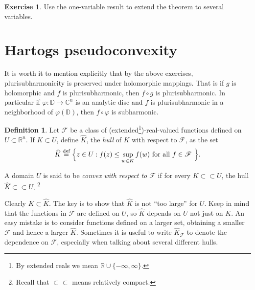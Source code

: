 \documentclass[12pt,openany]{book}
\newcommand{\C}{{\mathbb{C}}}
\newcommand{\R}{{\mathbb{R}}}
\newcommand{\D}{{\mathbb{D}}}
\newcommand{\sF}{{\mathscr{F}}}
\newcommand{\myindex}[1]{#1\index{#1}}
\theoremstyle{plain}
\theoremstyle{remark}
\theoremstyle{definition}
\newtheorem{defn}[thm]{Definition}
\newenvironment{exbox}{%
    \def\FrameCommand{\vrule width 1pt \relax\hspace {10pt}}%
    \MakeFramed {\advance \hsize -\width \FrameRestore }%
}{%
    \endMakeFramed
}
\theoremstyle{exercise}
\newtheorem{exercise}{Exercise}[section]
\theoremstyle{example}
\begin{document}
\begin{exbox}
\begin{exercise}
Use the one-variable result to extend the theorem to several variables.
\end{exercise}
\end{exbox}


\section{Hartogs pseudoconvexity}

It is worth it to mention explicitly that by the above
exercises, plurisubharmonicity is preserved under holomorphic mappings.
That is if $g$ is holomorphic and $f$ is plurisubharmonic, then
$f \circ g$ is plurisubharmonic.  In particular if $\varphi \colon \D \to
\C^n$ is an analytic disc and $f$ is plurisubharmonic in a neighborhood of
$\varphi(\D)$,
then $f \circ \varphi$ is subharmonic.

\begin{defn}
Let $\sF$ be a class of (extended\footnote{%
By extended reals we mean $\R \cup \{ -\infty,\infty\}$.})-real-valued functions defined on $U \subset \R^n$.  If $K
\subset U$, define $\widehat{K}$, the \emph{\myindex{hull}} of $K$ with
respect to $\sF$, as the set
%
\begin{equation*}
\widehat{K} \overset{\text{def}}{=} \Bigl\{ z \in U : f(z) \leq \sup_{w\in K} f(w)
\text{ for all $f \in \sF$ } \Bigr\} .
\end{equation*}

A domain $U$ is said to be \emph{convex with respect to $\sF$}\index{convex!with respect to $\sF$}
if for every $K \subset \subset U$, the hull $\widehat{K} \subset \subset U$.%
\footnote{Recall that $\subset \subset$ means relatively compact.}
\end{defn}

Clearly $K \subset \widehat{K}$.  The key is to show that $\widehat{K}$
is not ``too large'' for $U$.
Keep in mind that the functions in $\sF$ are defined on $U$, so $\widehat{K}$
depends on $U$ not just on $K$.  An easy mistake is to consider functions defined
on a larger set, obtaining a smaller $\sF$ and hence a larger
$\widehat{K}$.  Sometimes it is useful to write $\widehat{K}_{\sF}$ to
denote the dependence on $\sF$, especially when talking about several different
hulls.
\end{document}
